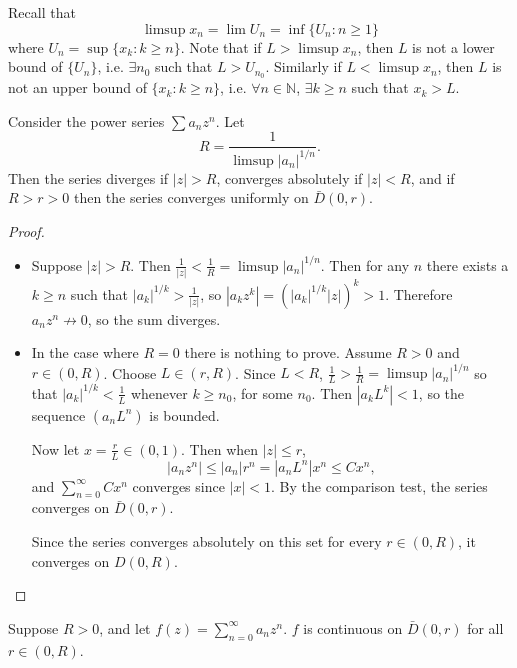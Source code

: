 Recall that
$$
\limsup x_n = \lim U_n = \inf \{ U_n : n \geq 1 \}
$$
where $U_n = \sup \{ x_k : k \geq n \}$.
Note that if $L > \limsup x_n$, then $L$ is not
a lower bound of $\{ U_n \}$, i.e.
$\exists n_0$ such that $L > U_{n_0}$.
Similarly if $L < \limsup x_n$, then
$L$ is not an upper bound of
$\{ x_k : k \geq n \}$, i.e.
$\forall n \in \mathbb{N}$,
$\exists k \geq n$ such that $x_k > L$.

\begin{theorem}
  Consider the power series $\sum a_n z^n$.
  Let
  $$
  R = \frac{1}{\limsup |a_n|^{1 / n}}.
  $$
  Then the series diverges if  $|z| > R$, converges absolutely if
  $|z| < R$, and if $R > r > 0$ then the series converges
  uniformly on $\bar{D}(0, r)$.
\end{theorem}

\begin{proof}
  \begin{itemize}
    \item{
      Suppose $|z| > R$. Then
      $\frac{1}{|z|} < \frac{1}{R} = \limsup |a_n|^{1 / n}$.
      Then for any $n$ there exists a $k \geq n$ such that
      $|a_k|^{1 / k} > \frac{1}{|z|}$, so
      $|a_k z^k| = (|a_k|^{1 / k} |z|)^k > 1$. Therefore
      $a_n z^n {\not \to} 0$, so the sum diverges.
    }
    \item{
      In the case where $R = 0$ there is nothing to prove.
      Assume $R > 0$ and $r \in (0 , R)$. Choose
      $L \in (r, R)$. Since $L < R$,
      $\frac{1}{L} > \frac{1}{R} = \limsup |a_n|^{1 / n}$
      so that $|a_k|^{1 / k} < \frac{1}{L}$ whenever
      $k \geq n_0$, for some $n_0$. Then $|a_k L^k| < 1$,
      so the sequence $(a_n L^n)$ is bounded.

      Now let $x = \frac{r}{L} \in (0, 1)$. Then when $|z| \leq r$,
      $$
      |a_n z^n| \leq |a_n| r^n = |a_n L^n| x^n \leq C x^n,
      $$
      and $\sum_{n=0}^\infty C x^n$ converges since $|x| < 1$. By the
      comparison test, the series converges on $\bar{D}(0, r)$.

      Since the series converges absolutely on this set for every
      $r \in (0, R)$, it converges on $D(0, R)$.
    }
  \end{itemize}
\end{proof}

\begin{corol}
  Suppose $R > 0$, and let $f(z) = \sum_{n=0}^\infty a_n z^n$.
  $f$ is continuous on $\bar{D}(0, r)$ for all $r \in (0, R)$.
\end{corol}

